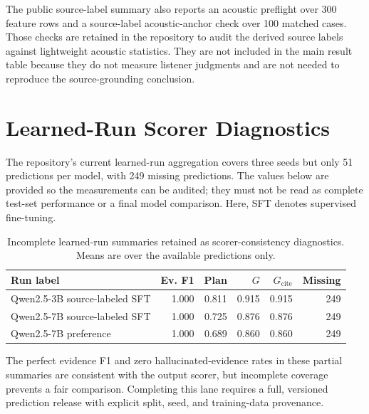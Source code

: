 \documentclass{article}
\begin{document}
The public source-label summary also reports an acoustic preflight over 300 feature rows and a source-label acoustic-anchor check over 100 matched cases. Those checks are retained in the repository to audit the derived source labels against lightweight acoustic statistics. They are not included in the main result table because they do not measure listener judgments and are not needed to reproduce the source-grounding conclusion.

\section{Learned-Run Scorer Diagnostics}
\label{app:learned}

The repository's current learned-run aggregation covers three seeds but only 51 predictions per model, with 249 missing predictions. The values below are provided so the measurements can be audited; they must not be read as complete test-set performance or a final model comparison. Here, SFT denotes supervised fine-tuning.

\begin{table}[h]
\centering
\caption{Incomplete learned-run summaries retained as scorer-consistency diagnostics. Means are over the available predictions only.}
\label{tab:learned}
\small
\begin{tabularx}{\linewidth}{@{}Yrrrrr@{}}
\toprule
\textbf{Run label} & \textbf{Ev. F1} & \textbf{Plan} & \textbf{$G$} & \textbf{$G_{\mathrm{cite}}$} & \textbf{Missing}\\
\midrule
Qwen2.5-3B source-labeled SFT & 1.000 & 0.811 & 0.915 & 0.915 & 249\\
Qwen2.5-7B source-labeled SFT & 1.000 & 0.725 & 0.876 & 0.876 & 249\\
Qwen2.5-7B preference & 1.000 & 0.689 & 0.860 & 0.860 & 249\\
\bottomrule
\end{tabularx}
\end{table}

The perfect evidence F1 and zero hallucinated-evidence rates in these partial summaries are consistent with the output scorer, but incomplete coverage prevents a fair comparison. Completing this lane requires a full, versioned prediction release with explicit split, seed, and training-data provenance.
\end{document}
